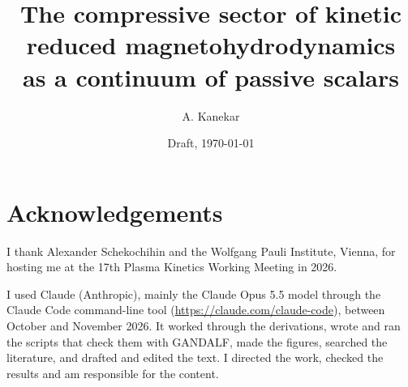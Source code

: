 \documentclass[11pt]{article}
\title{The compressive sector of kinetic reduced magnetohydrodynamics\\ as a continuum of passive scalars}
\author{A. Kanekar}
\date{Draft, \today}
\begin{document}
\maketitle

\begin{abstract}

\end{abstract}










\section*{Acknowledgements}
I thank Alexander Schekochihin and the Wolfgang Pauli Institute, Vienna, for hosting me at the 17th Plasma Kinetics Working Meeting in 2026.

I used Claude (Anthropic), mainly the Claude Opus 5.5 model through the Claude Code command-line tool (\url{https://claude.com/claude-code}), between October and November 2026. It worked through the derivations, wrote and ran the scripts that check them with GANDALF, made the figures, searched the literature, and drafted and edited the text. I directed the work, checked the results and am responsible for the content.

\appendix
\renewcommand{\theequation}{\thesection\arabic{equation}}
\renewcommand{\theHequation}{\thesection.\arabic{equation}}





\renewcommand{\bibfont}{\small}
\setlength{\bibsep}{2pt}


\end{document}
